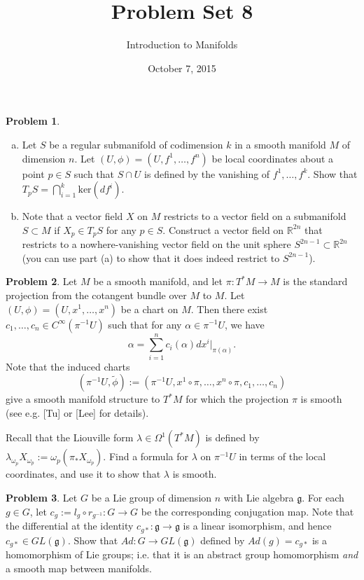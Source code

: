 \documentclass{amsart}
\newcommand{\+}[1]{\ensuremath{\mathbf{#1}}}
\newcommand{\R}{{\mathbb R}}
\theoremstyle{definition}
\newtheorem{prob}{Problem}
\begin{document}
\title{Problem Set 8}
\date{October 7, 2015}
\author{Introduction to Manifolds}

\maketitle

\begin{prob}
\begin{enumerate}[(a)]
 \item Let $S$ be a regular submanifold of codimension $k$ in a smooth manifold $M$ of dimension $n$.
Let $(U,\phi) = (U, f^1, \ldots, f^n)$ be local coordinates about a point $p \in S$
such that $S \cap U$ is defined by the vanishing of $f^1, \ldots, f^k$.
Show that $T_pS = \bigcap^k_{i = 1} \text{ker} (df^i)$.
\item Note that a vector field $X$ on $M$ restricts to a vector field on a submanifold $S \subset M$ if $X_p \in T_pS$
for any $p \in S$.  Construct a vector field on $\R^{2n}$ that restricts to a nowhere-vanishing vector
field on the unit sphere $S^{2n-1} \subset \R^{2n}$ (you can use part (a) to show that it does indeed
restrict to $S^{2n-1}$).
\end{enumerate}
\end{prob}

\begin{prob}
Let $M$ be a smooth manifold,
and let $\pi: T^*M \to M$ is the standard projection
from the cotangent bundle over $M$ to $M$.
Let $(U, \phi) = (U, x^1, \ldots, x^n)$ be a chart
on $M$.  Then there exist $c_1, \ldots, c_n \in C^{\infty}(\pi^{-1}U)$ 
such that for any $\alpha \in \pi^{-1}U$, we have
\[
\alpha = \sum^n_{i = 1} c_i(\alpha) dx^i|_{\pi(\alpha)}.
\]
Note that the induced charts 
\[
(\pi^{-1}U,\tilde{\phi}):=(\pi^{-1}U,x^1 \circ \pi,
\ldots, x^n \circ \pi, c_1, \ldots, c_n)
\]
give a smooth manifold structure to $T^*M$
for which the projection $\pi$ is smooth
(see e.g. [Tu] or [Lee] for details).


Recall that the Liouville form $\lambda \in \Omega^1(T^*M)$ 
is defined by $\lambda_{\omega_p}X_{\omega_p} := \omega_p(\pi_*X_{\omega_p})$.
Find a formula for $\lambda$ on $\pi^{-1}U$
in terms of the local coordinates, and use it
to show that $\lambda$ is smooth.
\end{prob}


\begin{prob}
Let $G$ be a Lie group of dimension $n$ with Lie algebra $\mathfrak{g}$.
For each $g \in G$, let $c_g := l_g \circ r_{g^{-1}}:G \to G$
be the corresponding conjugation map.  Note that
the differential at the identity $c_{g*}: \mathfrak{g} \to \mathfrak{g}$
is a linear isomorphism, and hence $c_{g*} \in GL(\mathfrak{g})$.
Show that $Ad: G \to GL(\mathfrak{g})$ defined by
$Ad(g) = c_{g*}$ is a homomorphism of Lie groups; i.e. that
it is an abstract group homomorphism \emph{and} a smooth map between
manifolds.
\end{prob}
\end{document}
